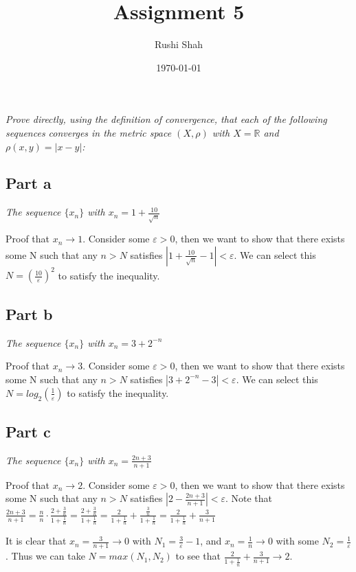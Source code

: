 \documentclass[]{article}
\author{Rushi Shah}
\date{\today}
\title{Assignment 5}
\newcommand{\reals}{\mathbb{R}}
\begin{document}
	\maketitle

	\section{}
		\textit{Prove directly, using the definition of convergence, that each of the following sequences converges in the metric space $(X, \rho)$ with $X = \reals$ and $\rho(x, y) = |x - y|$:}

		\subsection*{Part a}
		\textit{The sequence $\{x_n\}$ with $x_n = 1 + \frac{10}{\sqrt{n}}$}

		Proof that $x_n \to 1$. Consider some $\varepsilon > 0$, then we want to show that there exists some N such that any $n > N$ satisfies $|1 + \frac{10}{\sqrt{n}} - 1| < \varepsilon$. We can select this $N = (\frac{10}{\varepsilon})^2$ to satisfy the inequality. 

		\subsection*{Part b}
		\textit{The sequence $\{x_n\}$ with $x_n = 3 + 2^{-n}$}

		Proof that $x_n \to 3$. Consider some $\varepsilon > 0$, then we want to show that there exists some N such that any $n > N$ satisfies $|3 + 2^{-n} - 3| < \varepsilon$. We can select this $N = log_2(\frac{1}{\varepsilon})$ to satisfy the inequality. 

		\subsection*{Part c} 
		\textit{The sequence $\{x_n\}$ with $x_n = \frac{2n + 3}{n + 1}$}

		Proof that $x_n \to 2$. Consider some $\varepsilon > 0$, then we want to show that there exists some N such that any $n > N$ satisfies $|2 - \frac{2n + 3}{n + 1}| < \varepsilon$. Note that \(
			\frac{2n + 3}{n + 1} = 
			\frac{n}{n}\cdot \frac{2 + \frac{3}{n}}{1 + \frac{1}{n}} = 
			\frac{2 + \frac{3}{n}}{1 + \frac{1}{n}} = 
			\frac{2}{1 + \frac{1}{n}} + \frac{\frac{3}{n}}{1 + \frac{1}{n}} = 
			\frac{2}{1 + \frac{1}{n}} + \frac{3}{n + 1}
		\)

		It is clear that $x_n = \frac{3}{n + 1} \to 0$ with $N_1 = \frac{3}{\varepsilon} - 1$, and $x_n = \frac{1}{n} \to 0$ with some $N_2 = \frac{1}{\varepsilon}$. Thus we can take $N = max(N_1, N_2)$ to see that $\frac{2}{1 + \frac{1}{n}} + \frac{3}{n + 1} \to 2$. 
\end{document}
